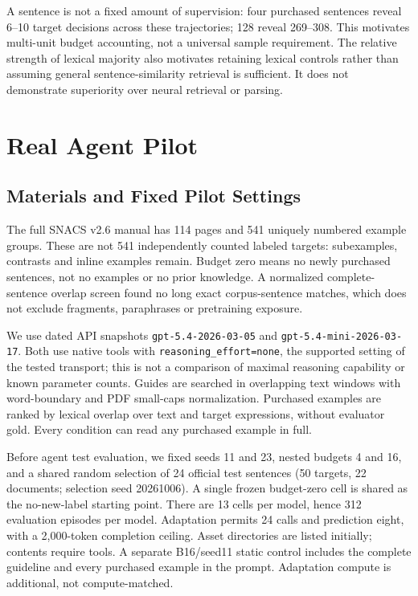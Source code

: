 \documentclass[11pt]{article}
\begin{document}
A sentence is not a fixed amount of supervision: four purchased sentences reveal 6--10 target decisions across these trajectories; 128 reveal 269--308. This motivates multi-unit budget accounting, not a universal sample requirement. The relative strength of lexical majority also motivates retaining lexical controls rather than assuming general sentence-similarity retrieval is sufficient. It does not demonstrate superiority over neural retrieval or parsing.

\section{Real Agent Pilot}
\subsection{Materials and Fixed Pilot Settings}
The full SNACS v2.6 manual has 114 pages and 541 uniquely numbered example groups. These are not 541 independently counted labeled targets: subexamples, contrasts and inline examples remain. Budget zero means no newly purchased sentences, not no examples or no prior knowledge. A normalized complete-sentence overlap screen found no long exact corpus-sentence matches, which does not exclude fragments, paraphrases or pretraining exposure.

We use dated API snapshots \texttt{gpt-5.4-2026-03-05} and \texttt{gpt-5.4-mini-2026-03-17}. Both use native tools with \texttt{reasoning\_effort=none}, the supported setting of the tested transport; this is not a comparison of maximal reasoning capability or known parameter counts. Guides are searched in overlapping text windows with word-boundary and PDF small-caps normalization. Purchased examples are ranked by lexical overlap over text and target expressions, without evaluator gold. Every condition can read any purchased example in full.

Before agent test evaluation, we fixed seeds 11 and 23, nested budgets 4 and 16, and a shared random selection of 24 official test sentences (50 targets, 22 documents; selection seed 20261006). A single frozen budget-zero cell is shared as the no-new-label starting point. There are 13 cells per model, hence 312 evaluation episodes per model. Adaptation permits 24 calls and prediction eight, with a 2,000-token completion ceiling. Asset directories are listed initially; contents require tools. A separate B16/seed11 static control includes the complete guideline and every purchased example in the prompt. Adaptation compute is additional, not compute-matched.
\end{document}
